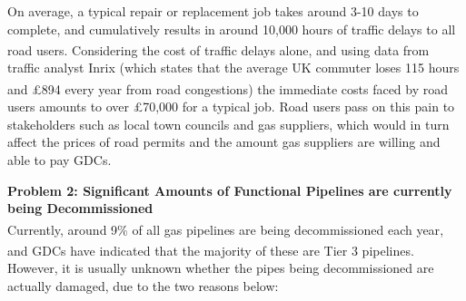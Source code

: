 \documentclass[11pt]{article}		%
\newcommand{\supercite}[1]{\textsuperscript{\cite{#1}}}		%
\begin{document}
    On average, a typical repair or replacement job takes around 3-10 days to complete, and cumulatively results in around 10,000 hours of traffic delays to all road users\supercite{pipeinspection}. Considering the cost of traffic delays alone, and using data from traffic analyst Inrix (which states that the average UK commuter loses 115 hours and £894 every year from road congestions\supercite{trafficreport}) the immediate costs faced by road users amounts to over £70,000 for a typical job. Road users pass on this pain to stakeholders such as local town councils and gas suppliers, which would in turn affect the prices of road permits and the amount gas suppliers are willing and able to pay GDCs. 
 	
    \textbf{Problem 2: Significant Amounts of Functional Pipelines are currently being Decommissioned}\\
    Currently, around 9\% of all gas pipelines are being decommissioned each year\supercite{decommission}, and GDCs have indicated that the majority of these are Tier 3 pipelines\supercite{decommission}. However, it is usually unknown whether the pipes being decommissioned are actually damaged, due to the two reasons below:
	
\end{document}
